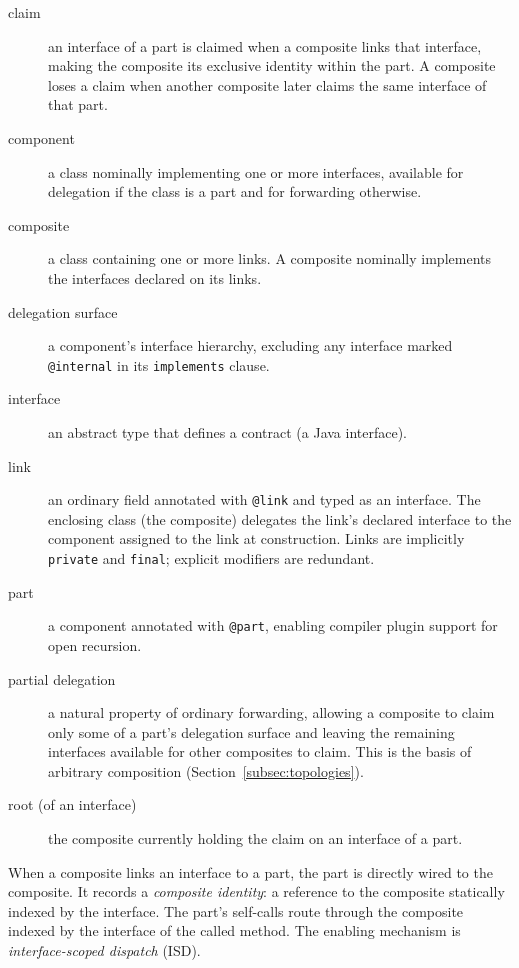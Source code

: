 \documentclass[acmsmall,screen,review,anonymous]{acmart}
\theoremstyle{acmplain}
\newcommand{\code}[1]{\texttt{#1}}
\begin{document}
\begin{description}
  \item[claim] an interface of a part is claimed when a composite links that interface, making the composite its exclusive
  identity within the part. A composite loses a claim when another composite later claims the same interface of that part.

  \item[component] a class nominally implementing one or more interfaces, available for delegation if the class is a part
  and for forwarding otherwise.

  \item[composite] a class containing one or more links. A composite nominally implements the interfaces declared on its
  links.

  \item[delegation surface] a component's interface hierarchy, excluding any interface marked \code{@internal} in its \code{implements}
  clause.

  \item[interface] an abstract type that defines a contract (a Java interface).

  \item[link] an ordinary field annotated with \code{@link} and typed as an interface. The enclosing class (the composite)
  delegates the link's declared interface to the component assigned to the link at construction. Links are implicitly \code{private}
  and \code{final}; explicit modifiers are redundant.

  \item[part] a component annotated with \code{@part}, enabling compiler plugin support for open recursion.

  \item[partial delegation] a natural property of ordinary forwarding, allowing a composite to claim only some of a part's
  delegation surface and leaving the remaining interfaces available for other composites to claim. This is the basis of
  arbitrary composition (Section~\ref{subsec:topologies}).

  \item[root (of an interface)] the composite currently holding the claim on an interface of a part.
\end{description}

When a composite links an interface to a part, the part is directly wired to the composite. It records a \emph{composite
identity}: a reference to the composite statically indexed by the interface. The part's self-calls route through the composite
indexed by the interface of the called method. The enabling mechanism is \emph{interface-scoped dispatch} (ISD).
\end{document}
